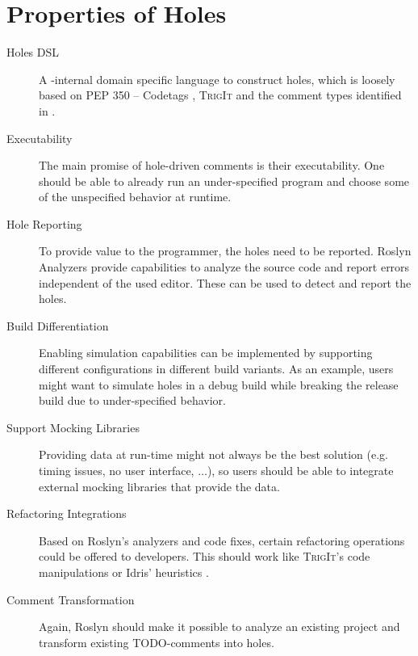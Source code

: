 \section{Properties of Holes}
\begin{description}
   \item[Holes DSL] A \CS-internal domain specific language to construct holes, which is loosely based on PEP 350 -- Codetags \cite{elliott_pep_2005}, \textsc{TrigIt} \cite{nie_framework_2019} and the comment types identified in \cite{ying_source_2005}.
   \item[Executability] The main promise of hole-driven comments is their executability. One should be able to already run an under-specified program and choose some of the unspecified behavior at runtime.
   \item[Hole Reporting] To provide value to the programmer, the holes need to be reported. Roslyn Analyzers provide capabilities to analyze the source code and report errors independent of the used editor. These can be used to detect and report the holes.
   \item[Build Differentiation] Enabling simulation capabilities can be implemented by supporting different configurations in different build variants. As an example, users might want to simulate holes in a debug build while breaking the release build due to under-specified behavior.
   \item[Support Mocking Libraries] Providing data at run-time might not always be the best solution (e.g. timing issues, no user interface, $\dotsc$), so users should be able to integrate external mocking libraries that provide the data.
   \item[Refactoring Integrations] Based on Roslyn's analyzers and code fixes, certain refactoring operations could be offered to developers. This should work like \textsc{TrigIt}'s code manipulations \cite{nie_framework_2019} or Idris' heuristics \cite{brady_type-driven_2017}.
   \item[Comment Transformation] Again, Roslyn should make it possible to analyze an existing project and transform existing TODO-comments into holes.
\end{description}